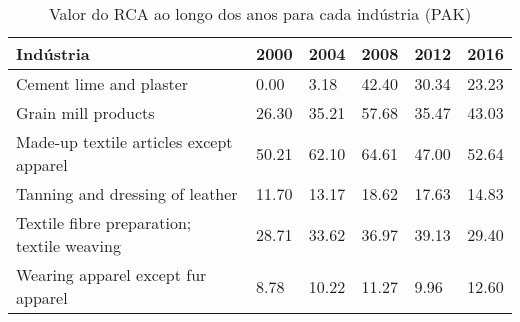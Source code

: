 \begin{table}
\centering
\caption{Valor do RCA ao longo dos anos para cada indústria (PAK)}
\begin{tabular}{p{6cm}p{1.5cm}p{1.5cm}p{1.5cm}p{1.5cm}p{1.5cm}}
\toprule
                                 Indústria &  2000 &  2004 &  2008 &  2012 &  2016 \\
\midrule
                   Cement lime and plaster &  0.00 &  3.18 & 42.40 & 30.34 & 23.23 \\
                       Grain mill products & 26.30 & 35.21 & 57.68 & 35.47 & 43.03 \\
   Made-up textile articles except apparel & 50.21 & 62.10 & 64.61 & 47.00 & 52.64 \\
           Tanning and dressing of leather & 11.70 & 13.17 & 18.62 & 17.63 & 14.83 \\
Textile fibre preparation; textile weaving & 28.71 & 33.62 & 36.97 & 39.13 & 29.40 \\
        Wearing apparel except fur apparel &  8.78 & 10.22 & 11.27 &  9.96 & 12.60 \\
\bottomrule
\end{tabular}
\end{table}
